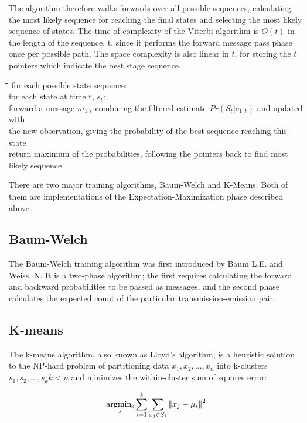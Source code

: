 \documentclass[12pt,a4,notitlepage]{report}
\renewcommand{\_}{\texttt{\symbol{95}}}
\newcommand{\<}{\texttt{\symbol{60}}}
\renewcommand{\>}{\texttt{\symbol{62}}}
\newenvironment{pseudocode}{\begin{slshape}\begin{tabbing}\hspace*{0.5cm}\=\hspace*{0.5cm}\=\hspace*{0.5cm}\= \kill }{\end{tabbing}\end{slshape}}
\begin{document}
The algorithm therefore walks forwards over all possible sequences, calculating the most likely sequence for reaching the final states and selecting the most likely sequence of states. The time of complexity of the Viterbi algorithm is $O(t)$ in the length of the sequence, t, since it performs the forward message pass phase once per possible path. The space complexity is also linear in $t$, for storing the $t$ pointers which indicate the best stage sequence.
\begin{pseudocode}
for each possible state sequence: \\
\>  for each state at time t, $s_t$: \\
\>\>    forward a message $m_{1:t}$ combining the filtered estimate $Pr(S_t|e_{1:t})$ and updated with \\\>\>the new observation, giving the probability of the best sequence reaching this state \\
\> return maximum of the probabilities, following the pointers back to find most likely sequence \\
\end{pseudocode}
There are two major training algorithms, Baum-Welch\cite{Baum-Welch} and K-Means\cite{K-Means}. Both of 
them are implementations of the Expectation-Maximization phase described above.

\subsection{Baum-Welch}

The Baum-Welch training algorithm was first introduced by Baum L.E. and Weiss, N\cite{Baum-Welch}. It is a two-phase algorithm; the first requires calculating the forward and backward probabilities to be passed as messages, and the second phase calculates the expected count of the particular transmission-emission pair.

\subsection{K-means}

The k-means algorithm, also known as Lloyd's algorithm, is a heuristic solution to the NP-hard problem of partitioning data $x_1, x_2, \ldots, x_n$ into k-clusters $s_1, s_2, \ldots, s_k k < n$ and minimizes the within-cluster sum of squares error:

\[
{\underset{s}{\operatornamewithlimits{argmin_s}}\sum_{i=1}^k \sum_{x_j \in S_i} {\|x_j-\mu_i\|}^2}
\]
\end{document}
